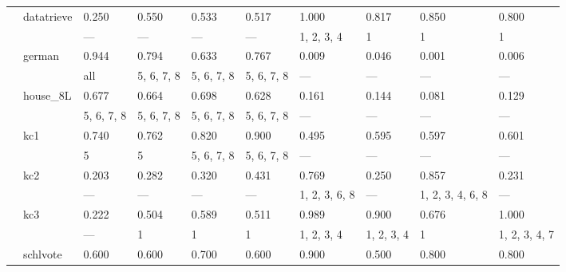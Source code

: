 \documentclass{article}
\begin{document}
\begin{center}
\begin{longtable}{p{1.2cm}p{1.8cm}p{1cm}p{1cm}p{1cm}p{1cm}p{1cm}p{1cm}p{1cm}p{1cm}}
             & datatrieve   & 0.250            & 0.550         & 0.533         & 0.517         & 1.000         & 0.817      & 0.850            & 0.800         \\
             &              & ---              & ---           & ---           & ---           & 1, 2, 3, 4    & 1          & 1                & 1             \\
             & german       & 0.944            & 0.794         & 0.633         & 0.767         & 0.009         & 0.046      & 0.001            & 0.006         \\
             &              & all              & 5, 6, 7, 8    & 5, 6, 7, 8    & 5, 6, 7, 8    & ---           & ---        & ---              & ---           \\
             & house\_8L     & 0.677            & 0.664         & 0.698         & 0.628         & 0.161         & 0.144      & 0.081            & 0.129         \\
             &              & 5, 6, 7, 8       & 5, 6, 7, 8    & 5, 6, 7, 8    & 5, 6, 7, 8    & ---           & ---        & ---              & ---           \\
             & kc1          & 0.740            & 0.762         & 0.820         & 0.900         & 0.495         & 0.595      & 0.597            & 0.601         \\
             &              & 5                & 5             & 5, 6, 7, 8    & 5, 6, 7, 8    & ---           & ---        & ---              & ---           \\
             & kc2          & 0.203            & 0.282         & 0.320         & 0.431         & 0.769         & 0.250      & 0.857            & 0.231         \\
             &              & ---              & ---           & ---           & ---           & 1, 2, 3, 6, 8 & ---        & 1, 2, 3, 4, 6, 8 & ---           \\
             & kc3          & 0.222            & 0.504         & 0.589         & 0.511         & 0.989         & 0.900      & 0.676            & 1.000         \\
             &              & ---              & 1             & 1             & 1             & 1, 2, 3, 4    & 1, 2, 3, 4 & 1                & 1, 2, 3, 4, 7 \\
             & schlvote     & 0.600            & 0.600         & 0.700         & 0.600         & 0.900         & 0.500      & 0.800            & 0.800         \\

\end{longtable}
\end{center}
\end{document}
